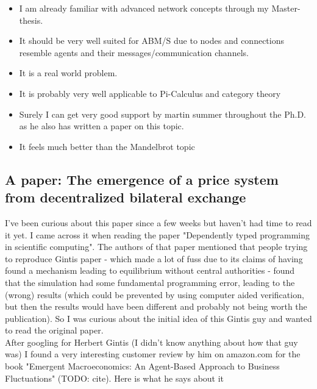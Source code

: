 \begin{itemize}
\item I am already familiar with advanced network concepts through my Master-thesis.
\item It should be very well suited for ABM/S due to nodes and connections resemble agents and their messages/communication channels.
\item It is a real world problem.
\item It is probably very well applicable to Pi-Calculus and category theory
\item Surely I can get very good support by martin summer throughout the Ph.D. as he also has written a paper on this topic.
\item It feels much better than the Mandelbrot topic
\end{itemize}

\subsection*{A paper: The emergence of a price system from decentralized bilateral exchange}

I've been curious about this paper since a few weeks but haven't had time to read it yet. I came across it when reading the paper "Dependently typed programming in scientific computing". The authors of that paper mentioned that people trying to reproduce Gintis paper - which made a lot of fuss due to its claims of having found a mechanism leading to equilibrium without central authorities - found that the simulation had some fundamental programming error, leading to the (wrong) results (which could be prevented by using computer aided verification, but then the results would have been different and probably not being worth the publication). So I was curious about the initial idea of this Gintis guy and wanted to read the original paper. \\

After googling for Herbert Gintis (I didn't know anything about how that guy was) I found a very interesting customer review by him on amazon.com for the book "Emergent Macroeconomics: An Agent-Based Approach to Business Fluctuations" (TODO: cite). Here is what he says about it

